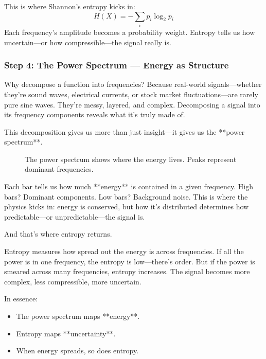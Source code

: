 This is where Shannon’s entropy kicks in:
\[
H(X) = - \sum_i p_i \log_2 p_i
\]
Each frequency’s amplitude becomes a probability weight. Entropy tells us how uncertain—or how compressible—the signal really is.


\subsubsection{Step 4: The Power Spectrum — Energy as Structure}

Why decompose a function into frequencies? Because real-world signals—whether they’re sound waves, electrical currents, or stock market fluctuations—are rarely pure sine waves. They’re messy, layered, and complex. Decomposing a signal into its frequency components reveals what it’s truly made of.

This decomposition gives us more than just insight—it gives us the **power spectrum**.

\begin{figure}[H]
\centering
{}
\caption{The power spectrum shows where the energy lives. Peaks represent dominant frequencies.}
\end{figure}

Each bar tells us how much **energy** is contained in a given frequency. High bars? Dominant components. Low bars? Background noise. This is where the physics kicks in: energy is conserved, but how it’s distributed determines how predictable—or unpredictable—the signal is.

And that’s where entropy returns.

Entropy measures how spread out the energy is across frequencies. If all the power is in one frequency, the entropy is low—there’s order. But if the power is smeared across many frequencies, entropy increases. The signal becomes more complex, less compressible, more uncertain.

In essence:
\begin{itemize}
  \item The power spectrum maps **energy**.
  \item Entropy maps **uncertainty**.
  \item When energy spreads, so does entropy.
\end{itemize}

